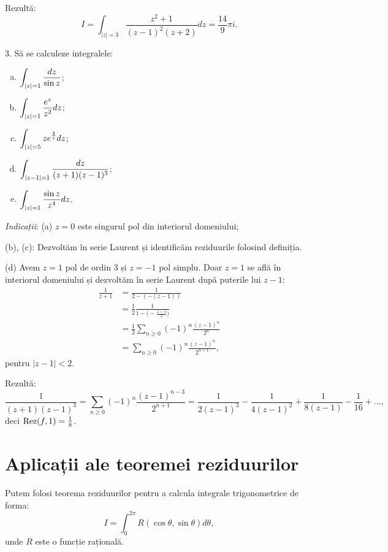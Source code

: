 Rezultă:
\[
  I = \int_{|z| = 3} \frac{z^2 + 1}{(z - 1)^2(z + 2)} dz = \frac{14}{9} \pi i.
\]

\vspace{1cm}

3. Să se calculeze integralele:
\begin{enumerate}[(a)]
\item $ \displaystyle\int_{|z| = 1} \frac{dz}{\sin z} $;
\item $ \displaystyle\int_{|z| = 1} \frac{e^z}{z^2}dz $;
\item $ \displaystyle\int_{|z| = 5} z e^{\frac{3}{z}} dz $;
\item $ \displaystyle\int_{|z - 1| = 1} \frac{dz}{(z + 1)(z - 1)^3} $;
\item $ \displaystyle\int_{|z| = 1} \frac{\sin z}{z^4} dz $.
\end{enumerate}

\emph{Indicații}: (a) $ z = 0 $ este singurul pol din interiorul domeniului;

(b), (c): Dezvoltăm în serie Laurent și identificăm reziduurile folosind definiția.

(d) Avem $ z = 1 $ pol de ordin 3 și $ z = -1 $ pol simplu. Doar $ z = 1 $ se află
în interiorul domeniului și dezvoltăm în serie Laurent după puterile lui $ z - 1 $:
\begin{align*}
  \frac{1}{z + 1} &= \frac{1}{2 - (-(z - 1))} \\
                  &= \frac{1}{2} \frac{1}{1 - \big(-\frac{z - 1}{2}\big)} \\
                  &= \frac{1}{2} \sum_{n \geq 0} (-1)^n \frac{(z - 1)^n}{2^n} \\
                  &= \sum_{n \geq 0} (-1)^n \frac{(z - 1)^n}{2^{n+1}},
\end{align*}
pentru $ |z - 1| < 2 $.

Rezultă:
\[
  \frac{1}{(z + 1)(z - 1)^3} = \sum_{n \geq 0} (-1)^n \frac{(z - 1)^{n-3}}{2^{n+1}} = %
  \frac{1}{2(z - 1)^3} - \frac{1}{4(z - 1)^2} + \frac{1}{8(z - 1)} - \frac{1}{16} + \dots,
\]
deci $ \mathrm{Rez}(f, 1) = \frac{1}{8} $.


\section{Aplicații ale teoremei reziduurilor}

\indent\indent Putem folosi teorema reziduurilor pentru a calcula integrale trigonometrice de forma:
\[
  I = \int_0^{2 \pi} R(\cos \theta, \sin \theta) d \theta,
\]
unde $ R $ este o funcție rațională.

